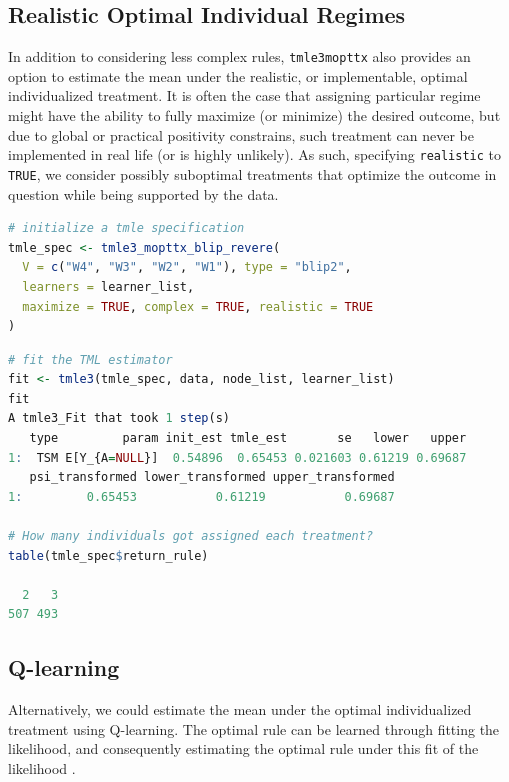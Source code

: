 \documentclass[12pt, krantz2,]{krantz}
\newcommand{\passthrough}[1]{#1}
\theoremstyle{definition}
\theoremstyle{definition}
\theoremstyle{definition}
\newcommand{\1}{\mathbbm{1}}
\begin{document}
\hypertarget{realistic-optimal-individual-regimes}{%
\subsection{Realistic Optimal Individual Regimes}\label{realistic-optimal-individual-regimes}}

In addition to considering less complex rules, \passthrough{\lstinline!tmle3mopttx!} also provides an
option to estimate the mean under the realistic, or implementable, optimal
individualized treatment. It is often the case that assigning particular regime
might have the ability to fully maximize (or minimize) the desired outcome, but
due to global or practical positivity constrains, such treatment can never be
implemented in real life (or is highly unlikely). As such, specifying
\passthrough{\lstinline!realistic!} to \passthrough{\lstinline!TRUE!}, we consider possibly suboptimal treatments that optimize
the outcome in question while being supported by the data.

\begin{lstlisting}[language=R]
# initialize a tmle specification
tmle_spec <- tmle3_mopttx_blip_revere(
  V = c("W4", "W3", "W2", "W1"), type = "blip2",
  learners = learner_list,
  maximize = TRUE, complex = TRUE, realistic = TRUE
)
\end{lstlisting}

\begin{lstlisting}[language=R]
# fit the TML estimator
fit <- tmle3(tmle_spec, data, node_list, learner_list)
fit
A tmle3_Fit that took 1 step(s)
   type         param init_est tmle_est       se   lower   upper
1:  TSM E[Y_{A=NULL}]  0.54896  0.65453 0.021603 0.61219 0.69687
   psi_transformed lower_transformed upper_transformed
1:         0.65453           0.61219           0.69687

# How many individuals got assigned each treatment?
table(tmle_spec$return_rule)

  2   3 
507 493 
\end{lstlisting}

\hypertarget{q-learning}{%
\subsection{Q-learning}\label{q-learning}}

Alternatively, we could estimate the mean under the optimal individualized
treatment using Q-learning. The optimal rule can be learned through fitting the
likelihood, and consequently estimating the optimal rule under this fit of the
likelihood \citep{Sutton1998, murphy2003}.
\end{document}
